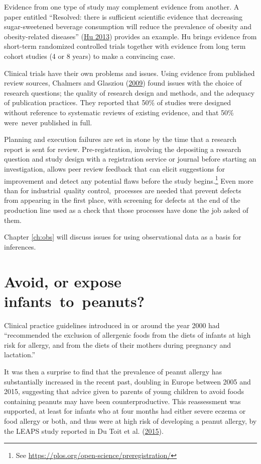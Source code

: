 \documentclass[
  10ptls,
  b5paper]{book}
\begin{document}
Evidence from one type of study may complement evidence from another. A
paper entitled ``Resolved: there is sufficient scientific evidence that
decreasing sugar-sweetened beverage consumption will reduce the
prevalence of obesity and obesity-related diseases'' (\protect\hyperlink{ref-hu2013resolved}{Hu 2013})
provides an example. Hu brings evidence from short-term randomized
controlled trials together with evidence from long term cohort studies
(4 or 8 years) to make a convincing case.

Clinical trials have their own problems and issues. Using evidence from
published review sources, Chalmers and Glasziou (\protect\hyperlink{ref-chalmers2009avoidable}{2009}) found issues with the
choice of research questions; the quality of research design and
methods, and the adequacy of publication practices. They reported that
50\% of studies were designed without reference to systematic reviews of
existing evidence, and that 50\% were~never published in full.

Planning and execution failures are set in stone by the time that a
research report is sent for review. Pre-registration, involving the
depositing a research question and study design with a registration
service or journal before starting an investigation, allows peer review
feedback that can elicit suggestions for improvement and detect any
potential flaws before the study begins.\footnote{See \url{https://plos.org/open-science/preregistration/}} Even more than
for industrial~quality control,~processes are needed that prevent
defects from appearing in the first place, with screening for defects at
the end of the production line used as a check that those processes have
done the job asked of them.

Chapter \ref{ch:obs} will discuss issues for using observational
data as a basis for inferences.

\hypertarget{avoid-or-expose-infants-to-peanuts}{%
\section{Avoid, or expose infants~to~peanuts?}\label{avoid-or-expose-infants-to-peanuts}}

Clinical practice guidelines introduced in or around the year 2000 had
``recommended the exclusion of allergenic foods from the diets of infants
at high risk for allergy, and from the diets of their mothers during
pregnancy and lactation.''

It was then a surprise to find that the prevalence of peanut allergy has
substantially increased in the recent past, doubling in Europe between
2005 and 2015, suggesting that advice given to parents of young children
to avoid foods containing peanuts may have been counterproductive. This
reassessment was supported, at least for infants who at four months had
either severe eczema or food allergy or both, and thus were at high risk
of developing a peanut allergy, by the LEAPS study reported in
Du Toit et al. (\protect\hyperlink{ref-du2015randomized}{2015}).
\end{document}
